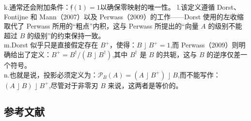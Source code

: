 k.通常还会附加条件：$\underline{\mathsf{f}}(1) = 1$以确保零映射的唯一性。
l.该定义遵循 Dorst、Fontijne 和 Mann（2007）以及 Perwass（2009）的工作——Dorst 使用的左收缩取代了 Perwass 所用的“粗点”内积，这与 Perwass 所提出的“向量 $A$ 的级别不能超过 $B$ 的级别”的约束保持一致。\\
m.Dorst 似乎只是直接假定存在 $B^{+}$，使得：$B \;\rfloor\; B^{+} = 1$,而 Perwass（2009）则明确给出了定义：$B^{+} =B^{\dagger}/(B \;\rfloor\; B^{\dagger})$,其中 $B^{\dagger}$ 是 $B$ 的共轭，这与 $B$ 的逆序仅差一个符号。\\
n.也就是说，投影必须定义为：$\mathcal{P}_{B}(A) = (A \;\rfloor\; B^{+}) \;\rfloor\; B$,而不能写作：$(A \;\rfloor\; B) \;\rfloor\; B^{+}$,尽管对于非零刃 $B$ 来说，这两者是等价的。
\subsection{参考文献}
